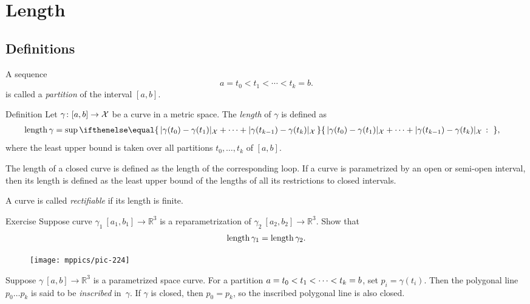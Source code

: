 \chapter{Length}
\label{chap:length}

\section{Definitions}

A sequence 
\[a=t_0 < t_1 < \cdots < t_k=b.\]
is called a \emph{partition} of the interval $[a,b]$.

\begin{thm}{Definition}\label{def:length}
Let $\gamma\colon[a,b]\to \mathcal{X}$ be a curve in a metric space.
The \emph{length} of $\gamma$ is defined as
\begin{align*}
\length \gamma
&= 
\sup
\set{\dist{\gamma(t_0)}{\gamma(t_1)}{\spc{X}}
+\dots+
\dist{\gamma(t_{k-1})}{\gamma(t_k)}{\spc{X}}}{},
\end{align*}
where the least upper bound is taken over all partitions $t_0,\dots,t_k$ of $[a,b]$.

The length of a closed curve is defined as the length of the corresponding loop.
If a curve is parametrized by an open or semi-open interval, then its length is defined as the least upper bound of the lengths of all its restrictions to closed intervals.
 
\end{thm}

A curve is called \emph{rectifiable} if its length is finite.

\begin{thm}{Exercise}\label{ex:integral-length-0}
Suppose curve $\gamma_1\:[a_1,b_1] \to\mathbb{R}^3$ is a reparametrization of $\gamma_2\:[a_2,b_2] \to\mathbb{R}^3$. 
Show that
\[\mathop{\rm length}\nolimits \gamma_1 = \mathop{\rm length}\nolimits \gamma_2.\]

\end{thm}

\begin{wrapfigure}[4]{r}{33 mm}
\vskip-4mm
\centering
\texttt{[image: mppics/pic-224]}
\end{wrapfigure}

Suppose $\gamma\:[a,b]\to \mathbb{R}^3$ is a parametrized space curve.
For a partition $a=t_0 < t_1 < \z\cdots < t_k=b$, set $p_i=\gamma(t_i)$.
Then the polygonal line $p_0\dots p_k$ is said to be \emph{inscribed} in~$\gamma$.
If $\gamma$ is closed, then $p_0=p_k$, so the inscribed polygonal line is also closed.

